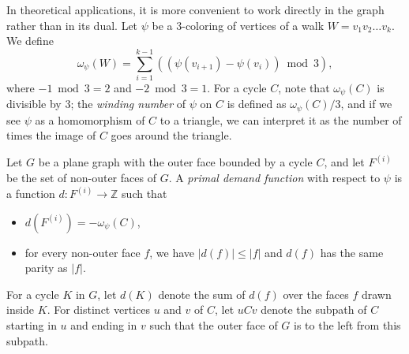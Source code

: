 \documentclass[12pt,twoside,openright,a4paper]{book}
\begin{document}
In theoretical applications, it is more convenient to work directly in the graph rather than in its dual.
Let $\psi$ be a $3$-coloring of vertices of a walk $W=v_1v_2\ldots v_k$.
We define $$\omega_\psi(W)=\sum_{i=1}^{k-1}((\psi(v_{i+1})-\psi(v_i))\bmod 3),$$
where $-1\bmod 3=2$ and $-2\bmod 3=1$.  For a cycle $C$, note that $\omega_\psi(C)$ is divisible by $3$;
the \emph{winding number} of $\psi$ on $C$ is defined as $\omega_\psi(C)/3$, and if we see $\psi$ as
a homomorphism of $C$ to a triangle, we can interpret it as the number of times the image of $C$ goes around the triangle.

Let $G$ be a plane graph with the outer face bounded by a cycle $C$, and let $F^{(i)}$ be the set of non-outer faces of $G$.
A \emph{primal demand function} with respect to $\psi$ is a function $d:F^{(i)}\to\mathbb{Z}$ such that
\begin{itemize}
\item $d(F^{(i)})=-\omega_\psi(C)$, 
\item for every non-outer face $f$, we have $|d(f)|\le |f|$ and $d(f)$ has the same parity as $|f|$.
\end{itemize}
For a cycle $K$ in $G$, let $d(K)$ denote the sum of $d(f)$ over the faces $f$ drawn inside $K$.
For distinct vertices $u$ and $v$ of $C$, let $uCv$ denote the subpath of $C$ starting in $u$ and ending in $v$
such that the outer face of $G$ is to the left from this subpath.
\end{document}
